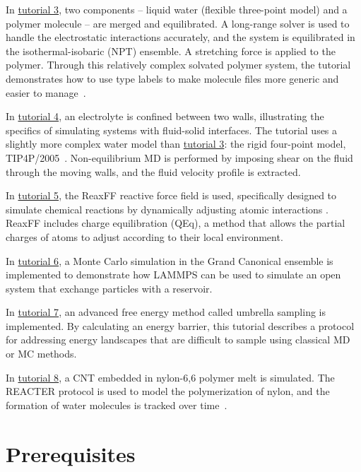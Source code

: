 \documentclass[9pt,tutorial]{livecoms}
\begin{document}
In \hyperref[all-atom-label]{tutorial 3}, two components --
liquid water (flexible three-point model) and a polymer molecule -- are merged and equilibrated.  A long-range
solver is used to handle the electrostatic interactions accurately, and
the system is equilibrated in the isothermal-isobaric (NPT) ensemble.  A
stretching force is applied to the polymer.  Through this relatively
complex solvated polymer system, the tutorial demonstrates how to use
type labels to make molecule files more generic and easier to manage~\cite{typelabel_paper}.

In \hyperref[sheared-confined-label]{tutorial 4}, an electrolyte is confined between
two walls, illustrating the specifics of simulating systems
with fluid-solid interfaces.  The tutorial uses a slightly more
complex water model than \hyperref[all-atom-label]{tutorial 3}: the rigid
four-point model, TIP4P/2005~\cite{abascal2005general}.  Non-equilibrium MD is
performed by imposing shear on the fluid through the moving walls,
and the fluid velocity profile is extracted.

In \hyperref[reactive-silicon-dioxide-label]{tutorial 5}, the ReaxFF
reactive force field is used, specifically designed
to simulate chemical reactions by dynamically adjusting
atomic interactions \cite{van2001reaxff}.  ReaxFF includes charge equilibration
(QEq), a method that allows the partial charges of atoms
to adjust according to their local environment.

In \hyperref[gcmc-silica-label]{tutorial 6}, a Monte Carlo simulation in
the Grand Canonical ensemble is implemented to demonstrate how
LAMMPS can be used to simulate an open system that exchange
particles with a reservoir.

In \hyperref[umbrella-sampling-label]{tutorial 7}, an advanced free
energy method called umbrella sampling is implemented.  By calculating
an energy barrier, this tutorial describes a protocol
for addressing energy landscapes that are difficult to sample using
classical MD or MC methods.

In \hyperref[bond-react-label]{tutorial 8}, a CNT embedded in
nylon-6,6 polymer melt is simulated.  The
REACTER protocol is used to model the polymerization of nylon, and the formation
of water molecules is tracked over time~\cite{gissinger2020reacter}.

\section{Prerequisites}
\end{document}
